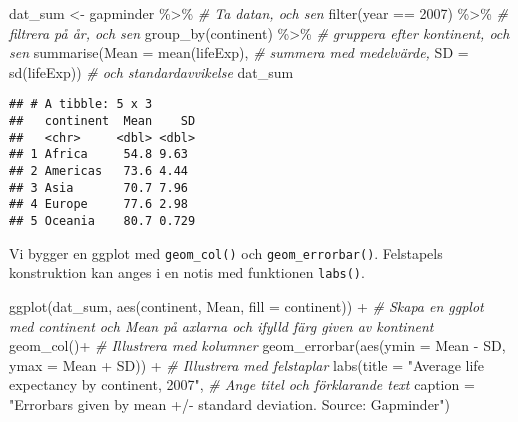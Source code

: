 \documentclass[
]{book}
\newenvironment{Shaded}{\begin{snugshade}}{\end{snugshade}}
\newcommand{\AttributeTok}[1]{\textcolor[rgb]{0.77,0.63,0.00}{#1}}
\newcommand{\CommentTok}[1]{\textcolor[rgb]{0.56,0.35,0.01}{\textit{#1}}}
\newcommand{\DecValTok}[1]{\textcolor[rgb]{0.00,0.00,0.81}{#1}}
\newcommand{\FunctionTok}[1]{\textcolor[rgb]{0.00,0.00,0.00}{#1}}
\newcommand{\NormalTok}[1]{#1}
\newcommand{\OtherTok}[1]{\textcolor[rgb]{0.56,0.35,0.01}{#1}}
\newcommand{\SpecialCharTok}[1]{\textcolor[rgb]{0.00,0.00,0.00}{#1}}
\newcommand{\StringTok}[1]{\textcolor[rgb]{0.31,0.60,0.02}{#1}}
\theoremstyle{definition}
\theoremstyle{definition}
\theoremstyle{definition}
\theoremstyle{definition}
\theoremstyle{remark}
\begin{document}
\begin{Shaded}
\begin{Highlighting}[]
\NormalTok{dat\_sum }\OtherTok{\textless{}{-}}\NormalTok{ gapminder }\SpecialCharTok{\%\textgreater{}\%}                         \CommentTok{\# Ta datan, och sen}
  \FunctionTok{filter}\NormalTok{(year }\SpecialCharTok{==} \DecValTok{2007}\NormalTok{) }\SpecialCharTok{\%\textgreater{}\%}                       \CommentTok{\# filtrera på år, och sen}
  \FunctionTok{group\_by}\NormalTok{(continent) }\SpecialCharTok{\%\textgreater{}\%}                        \CommentTok{\# gruppera efter kontinent, och sen}
  \FunctionTok{summarise}\NormalTok{(}\AttributeTok{Mean =} \FunctionTok{mean}\NormalTok{(lifeExp),                }\CommentTok{\# summera med medelvärde,}
            \AttributeTok{SD =} \FunctionTok{sd}\NormalTok{(lifeExp))                    }\CommentTok{\# och standardavvikelse}
\NormalTok{dat\_sum}
\end{Highlighting}
\end{Shaded}

\begin{verbatim}
## # A tibble: 5 x 3
##   continent  Mean    SD
##   <chr>     <dbl> <dbl>
## 1 Africa     54.8 9.63 
## 2 Americas   73.6 4.44 
## 3 Asia       70.7 7.96 
## 4 Europe     77.6 2.98 
## 5 Oceania    80.7 0.729
\end{verbatim}

Vi bygger en ggplot med \texttt{geom\_col()} och \texttt{geom\_errorbar()}. Felstapels konstruktion kan anges i en notis med funktionen \texttt{labs()}.

\begin{Shaded}
\begin{Highlighting}[]
\FunctionTok{ggplot}\NormalTok{(dat\_sum, }\FunctionTok{aes}\NormalTok{(continent, Mean, }\AttributeTok{fill =}\NormalTok{ continent)) }\SpecialCharTok{+}          \CommentTok{\# Skapa en ggplot med continent och Mean på axlarna och ifylld färg given av kontinent}
  \FunctionTok{geom\_col}\NormalTok{()}\SpecialCharTok{+}                                                      \CommentTok{\# Illustrera med kolumner}
  \FunctionTok{geom\_errorbar}\NormalTok{(}\FunctionTok{aes}\NormalTok{(}\AttributeTok{ymin =}\NormalTok{ Mean }\SpecialCharTok{{-}}\NormalTok{ SD, }\AttributeTok{ymax =}\NormalTok{ Mean }\SpecialCharTok{+}\NormalTok{ SD)) }\SpecialCharTok{+}         \CommentTok{\# Illustrera med felstaplar}
  \FunctionTok{labs}\NormalTok{(}\AttributeTok{title =} \StringTok{"Average life expectancy by continent, 2007"}\NormalTok{,       }\CommentTok{\# Ange titel och förklarande text}
       \AttributeTok{caption =} \StringTok{"Errorbars given by mean +/{-} standard deviation.}
\StringTok{       Source: Gapminder"}\NormalTok{)}
\end{Highlighting}
\end{Shaded}
\end{document}
